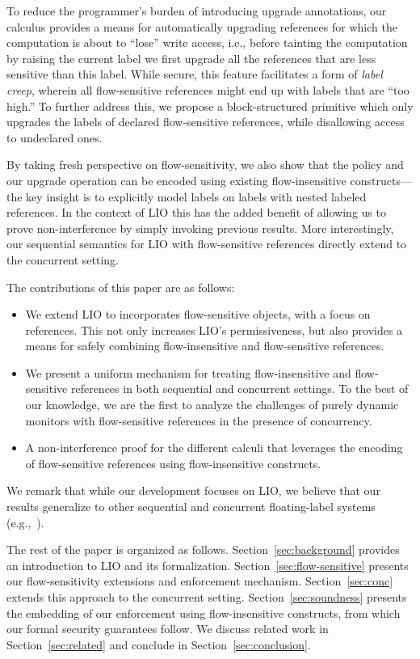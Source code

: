 To reduce the programmer's burden of introducing upgrade annotations, our
calculus provides a means for automatically upgrading references for which the
computation is about to ``lose'' write access, i.e., before tainting the
computation by raising the current label we first upgrade all the references
that are less sensitive than this label.
%
While secure, this feature facilitates a form of \emph{label creep},
wherein all flow-sensitive references might end up with labels that
are ``too high.''
%
To further address this, we propose a block-structured primitive which
only upgrades the labels of declared flow-sensitive references, while
disallowing access to undeclared ones.
 
By taking fresh perspective on flow-sensitivity, we also show that the {\nsu}
policy and our upgrade operation can be encoded using existing flow-insensitive
constructs---the key insight is to explicitly model labels on labels with
nested labeled references.
%
In the context of LIO this has the added benefit of allowing us to prove
non-interference by simply invoking previous results.
%
More interestingly, our sequential semantics for LIO with flow-sensitive
references directly extend to the concurrent setting.
 
The contributions of this paper are as follows:
\begin{itemize}

\item We extend LIO to incorporates flow-sensitive objects, with a focus on
references. This not only increases LIO's permissiveness, but also provides a
means for safely combining flow-insensitive and flow-sensitive references.

\item We present a uniform mechanism for treating flow-insensitive and
flow-sensitive references in both sequential and concurrent settings. To the
best of our knowledge, we are the first to analyze the challenges of purely
dynamic monitors with flow-sensitive references in the presence of concurrency.

\item A non-interference proof for the different calculi that leverages the
encoding of flow-sensitive references using flow-insensitive constructs.
\end{itemize}
%
We remark that while our development focuses on LIO, we believe that
our results generalize to other sequential and concurrent
floating-label systems (e.g.,~\cite{Breeze, Efstathopoulos:2005,
zeldovich:histar, krohn:flume}).

The rest of the paper is organized as follows. Section~\ref{sec:background}
provides an introduction to LIO and its formalization.
Section~\ref{sec:flow-sensitive} presents our flow-sensitivity extensions and
enforcement mechanism. Section~\ref{sec:conc} extends this approach to the
concurrent setting. Section~\ref{sec:soundness} presents the embedding of our
enforcement using flow-insensitive constructs, from which our formal security
guarantees follow.  We discuss related work in Section~\ref{sec:related} and
conclude in Section~\ref{sec:conclusion}.


